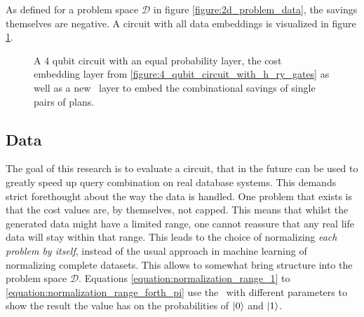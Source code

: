 As defined for a problem space $\mathcal{D}$ in figure \ref{figure:2d_problem_data}, the savings themselves are negative. A circuit with all data embeddings is visualized in figure \ref{figure:4_qubit_circuit_with_h_ry_crz_gates}.

\begin{figure}[!h]
    \centering
    \caption{A 4 qubit circuit with an equal probability layer, the cost embedding layer from \ref{figure:4_qubit_circuit_with_h_ry_gates} as well as a new \crzgate\ layer to embed the combinational savings of single pairs of plans.}
    \label{figure:4_qubit_circuit_with_h_ry_crz_gates}
\end{figure}

\subsection{Data}

The goal of this research is to evaluate a circuit, that in the future can be used to greatly speed up query combination on real database systems. This demands strict forethought about the way the data is handled. One problem that exists is that the cost values are, by themselves, not capped. This means that whilst the generated data might have a limited range, one cannot reassure that any real life data will stay within that range. This leads to the choice of normalizing \emph{each problem by itself}, instead of the usual approach in machine learning of normalizing complete datasets. This allows to somewhat bring structure into the problem space $\mathcal{D}$. Equations \ref{equation:normalization_range_1} to \ref{equation:normalization_range_forth_pi} use the \rygate\ with different parameters to show the result the value has on the probabilities of $\ket{0}$ and $\ket{1}$.

